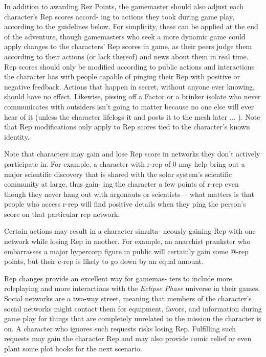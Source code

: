 In addition to awarding Rez Points, the gamemaster 
should also adjust each character's Rep scores accord-
ing to actions they took during game play, according to 
the guidelines below. For simplicity, these can be applied 
at the end of the adventure, though gamemasters who 
seek a more dynamic game could apply changes to the 
characters' Rep scores in game, as their peers judge 
them according to their actions (or lack thereof) and 
news about them in real time. Rep scores should only 
be modified according to public actions and interactions 
the character has with people capable of pinging their 
Rep with positive or negative feedback. Actions that 
happen in secret, without anyone ever knowing, should 
have no effect. Likewise, pissing off a Factor or a brinker 
isolate who never communicates with outsiders isn't 
going to matter because no one else will ever hear of it 
(unless the character lifelogs it and posts it to the mesh 
later ... ). Note that Rep modifications only apply to Rep 
scores tied to the character's known identity. 

Note that characters may gain and lose Rep score 
in networks they don't actively participate in. For 
example, a character with r-rep of 0 may help bring 
out a major scientific discovery that is shared with the 
solar system's scientific community at large, thus gain-
ing the character a few points of r-rep even though 
they never hang out with argonauts or scientists—
what matters is that people who access r-rep will find 
positive details when they ping the person's score on 
that particular rep network. 

Certain actions may result in a character simulta-
neously gaining Rep with one network while losing 
Rep in another. For example, an anarchist prankster 
who embarrasses a major hypercorp figure in public 
will certainly gain some @-rep points, but their c-rep 
is likely to go down by an equal amount.

Rep changes provide an excellent way for gamemas-
ters to include more roleplaying and more interactions 
with the \textit{Eclipse Phase} universe in their games. Social 
networks are a two-way street, meaning that members 
of the character's social networks might contact them 
for equipment, favors, and information during game 
play for things that are completely unrelated to the 
mission the character is on. A character who ignores 
such requests risks losing Rep. Fulfilling such requests 
may gain the character Rep and may also provide 
comic relief or even plant some plot hooks for the 
next scenario.

